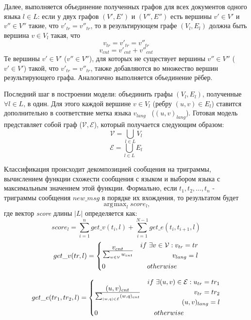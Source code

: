 \documentclass[a4paper, 14pt]{article}
\DeclareMathOperator*{\argmax}{\arg\!\max}
\begin{document}
		Далее, выполняется объединение полученных графов для всех документов одного языка $l \in L$: если у двух графов $(V', E')$ и $(V'', E'')$ есть вершины
		$v' \in V'$ и $v'' \in V''$ такие, что $v'_{tr} = v''_{tr}$, то в результирующем графе $(V_{l}, E_{l})$ должна быть вершина 
		$v \in V_{l}$ такая, что 
		$$v_{tr} = v'_{tr} = v''_{tr}$$ $$v_{cnt} = v'_{cnt} + v''_{cnt}$$
		Те вершины $v' \in V'$ ($v'' \in V''$), для которых  не существует вершины $v'' \in V''$ ($v' \in V'$) такой, что $v'_{tr} = v''_{tr}$, также добавляются во множество вершин результирующего графа.
		Аналогично выполняется объединение рёбер.
		
		Последний шаг в построении модели: объединить графы $(V_{l}, E_{l})$, полученные $\forall l \in L$, в один. 
		Для этого каждой вершине $v \in V_{l}$
		(ребру $(u, v) \in E_{l}$) ставится дополнительно в соответствие метка языка $v_{lang}$ \ ($(u, v)_{lang}$). 
		Готовая модель представляет собой граф
		($\mathcal{V}, \mathcal{E}$), который получается следующим образом:
		$$ \mathcal{V} = \bigcup_{l \in L} V_{l}$$
		$$ \mathcal{E} = \bigcup_{l \in L} E_{l}$$
		
		Классификация происходит декомпозицией сообщения на триграммы, вычислением функции схожести сообщения с языком и
		выбором языка с максимальным значением этой функции. Формально, если
		$t_{1}, t_{2}, \ldots, t_{n}$ - триграммы сообщения $new\_msg$ в порядке их вхождения, то результатом будет
		$$ \argmax_{l} score_{l} ,$$
		где вектор \textit{score} длины $|L|$ определяется как:
		$$ score_{l} = \sum_{i=1}^{n} get\_v(t_{i}, l) + \sum_{i=1}^{N-1} get\_e(t_{i}, t_{i+1}, l)$$
		\[
 		get\_v(tr, l) =
 		  \begin{dcases}
  		   v_{cnt} \over \sum_{w \in \mathcal{V}} w_{cnt} & 
  		   \begin{split} 
					 if \ \exists v \in \mathcal{V}: v_{tr}=tr \\ v_{lang}=l	
  		   	\end{split} \\
  		   0 & \quad otherwise
  		 \end{dcases}
		\]		
		
		\[
 		get\_e(tr_1, tr_2, l) =
 		  \begin{dcases}
  		   (u, v)_{cnt} \over \sum_{(w, q) \in \mathcal{E}} (w, q)_{cnt} & 
  		    \begin{split} 
					 if \ \exists (u, v) \in \mathcal{E}:  u_{tr}=tr_1 \\ v_{tr}=tr_2 \\ (u, v)_{lang}=l
  		   	\end{split} \\
  		   0 & \quad otherwise
  		 \end{dcases}
		\]	
		
\end{document}
